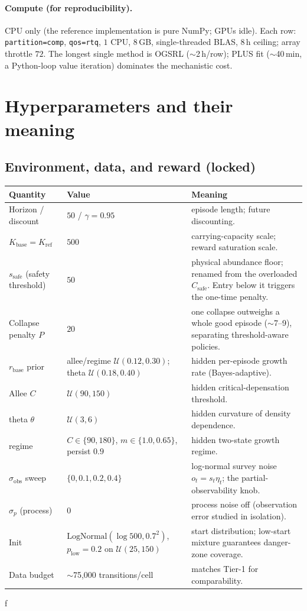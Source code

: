 \documentclass[11pt]{article}
\newcommand{\rbase}{r_{\mathrm{base}}}
\newcommand{\Kbase}{K_{\mathrm{base}}}
\newcommand{\Kref}{K_{\mathrm{ref}}}
\newcommand{\sobs}{\sigma_{\mathrm{obs}}}
\newcommand{\Csafe}{C_{\mathrm{safe}}}
\newcommand{\sthr}{s_{\mathrm{safe}}}
\begin{document}
\paragraph{Compute (for reproducibility).} CPU only (the reference implementation
is pure NumPy; GPUs idle). Each row: \texttt{partition=comp}, \texttt{qos=rtq},
$1$ CPU, $8$\,GB, single-threaded BLAS, $8$\,h ceiling; array throttle $72$. The
longest single method is OGSRL ($\sim$2\,h/row); PLUS fit ($\sim$40\,min, a
Python-loop value iteration) dominates the mechanistic cost.

\section{Hyperparameters and their meaning}
\label{sec:hyper}

\subsection{Environment, data, and reward (locked)}
\begin{longtable}{@{}p{3.4cm}p{4.0cm}p{6.6cm}@{}}
\toprule
Quantity & Value & Meaning \\
\midrule
Horizon / discount & $50$ / $\gamma{=}0.95$ & episode length; future discounting. \\
$\Kbase=\Kref$ & $500$ & carrying-capacity scale; reward saturation scale. \\
$\sthr$ (safety threshold) & $50$ & physical abundance floor; renamed from the
overloaded $\Csafe$. Entry below it triggers the one-time penalty. \\
Collapse penalty $P$ & $20$ & one collapse outweighs a whole good episode
($\sim$7--9), separating threshold-aware policies. \\
$\rbase$ prior & allee/regime $\mathcal{U}(0.12,0.30)$; theta $\mathcal{U}(0.18,0.40)$ & hidden per-episode growth rate (Bayes-adaptive). \\
Allee $C$ & $\mathcal{U}(90,150)$ & hidden critical-depensation threshold. \\
theta $\theta$ & $\mathcal{U}(3,6)$ & hidden curvature of density dependence. \\
regime & $C\!\in\!\{90,180\}$, $m\!\in\!\{1.0,0.65\}$, persist $0.9$ & hidden two-state growth regime. \\
$\sobs$ sweep & $\{0,0.1,0.2,0.4\}$ & log-normal survey noise $o_t=s_t\eta_t$; the partial-observability knob. \\
$\sigma_p$ (process) & $0$ & process noise off (observation error studied in isolation). \\
Init & $\mathrm{LogNormal}(\log 500,0.7^2)$, $p_{\mathrm{low}}{=}0.2$ on $\mathcal{U}(25,150)$ & start distribution; low-start mixture guarantees danger-zone coverage. \\
Data budget & $\sim$75{,}000 transitions/cell & matches Tier-1 for comparability. \\
\bottomrule
\end{longtable}
f
\end{document}
